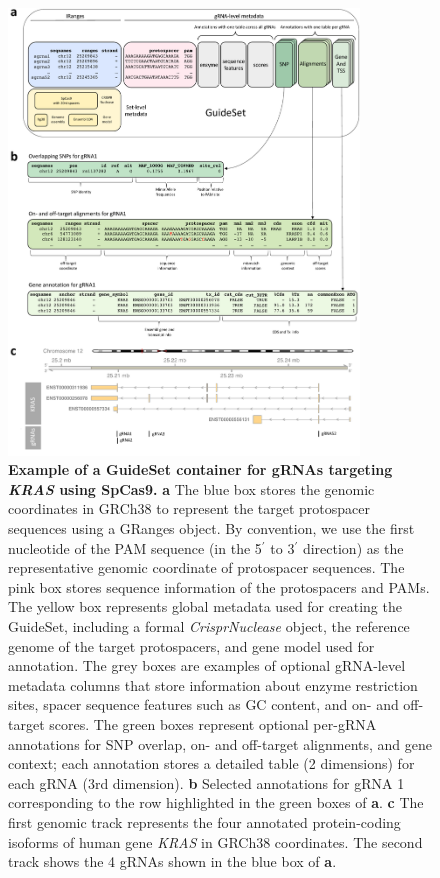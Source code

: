 \documentclass[pdftex,english,10pt]{article}
\begin{document}
{%
\begin{figure}
\centering
\includegraphics[width=0.83\textwidth]{Figure2.pdf}
  \caption{\textbf{Example of a GuideSet container for gRNAs targeting \textit{KRAS} using SpCas9.} 
 \textbf{a} The blue box stores the genomic coordinates in GRCh38 to represent the target protospacer sequences using a GRanges object. 
By convention, we use the first nucleotide of the PAM sequence (in the 5$^{\prime}$ to 3$^{\prime}$ direction) as the representative genomic coordinate of protospacer sequences. The pink box stores sequence information of the protospacers and PAMs. The yellow box represents global metadata used for creating the GuideSet, including a formal \textit{CrisprNuclease} object, the reference genome of the target protospacers, and gene model used for annotation. The grey boxes are examples of optional gRNA-level metadata columns that store information about enzyme restriction sites, spacer sequence features such as GC content, and on- and off-target scores. The green boxes represent optional per-gRNA annotations for SNP overlap, on- and off-target alignments, and gene context; each annotation stores a detailed table (2 dimensions) for each gRNA (3rd dimension). 
\textbf{b} Selected annotations for gRNA 1 corresponding to the row highlighted in the green boxes of \textbf{a}. 
\textbf{c} The first genomic track represents the four annotated protein-coding isoforms of human gene \textit{KRAS} in GRCh38 coordinates. The second track shows the 4 gRNAs shown in the blue box of \textbf{a}.
}
  \label{fig:guideset}
\end{figure}


}
\end{document}
